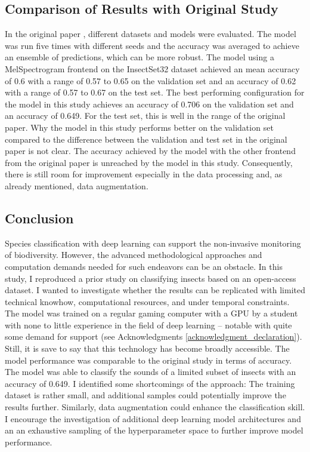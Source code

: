 \subsection{Comparison of Results with Original Study}%

In the original paper \autocite{faissAdaptiveRepresentationsSound2023},
different datasets and models were evaluated. The model was
run five times with different seeds and the accuracy was averaged to achieve an ensemble of predictions, 
which can be more robust. The model using a MelSpectrogram
frontend on the InsectSet32 dataset achieved an mean accuracy of 0.6 with a range of 0.57 to 0.65
on the validation set and an accuracy of 0.62 with a range of 0.57 to 0.67 on the test set.
The best performing configuration for the model in this study achieves an accuracy of 0.706 on the validation set
and an accuracy of 0.649. For the test set, this is well in the range of the original paper.
Why the model in this study performs better on the validation set compared to the difference
between the validation and test set in the original paper is not clear. The accuracy achieved
by the model with the other frontend from the original paper is unreached by the model in this study.
Consequently, there is still room for improvement especially in the data processing and, as already mentioned, data augmentation.

\subsection{Conclusion}%

Species classification with deep learning can support the non-invasive monitoring of biodiversity.
However, the advanced methodological approaches and computation demands needed for such endeavors can be an obstacle.
In this study, I reproduced a prior study on classifying insects based on an open-access dataset.
I wanted to investigate whether the results can be replicated with limited technical knowhow, 
computational resources, and under temporal constraints.
The model was trained on a regular gaming computer with a GPU by a student with none to little experience
in the field of deep learning -- notable with quite some demand for support (see Acknowledgments \ref{acknowledgment_declaration}).
Still, it is save to say that this technology has become broadly accessible.
The model performance was comparable to the original study in terms of accuracy.
The model was able to classify the sounds of a limited subset of insects with an accuracy of 0.649.
I identified some shortcomings of the approach:
The training dataset is rather small, and additional samples could potentially improve the results further.
Similarly, data augmentation could enhance the classification skill.
I encourage the investigation of additional deep learning model architectures and 
an an exhaustive sampling of the hyperparameter space to further improve model performance.
